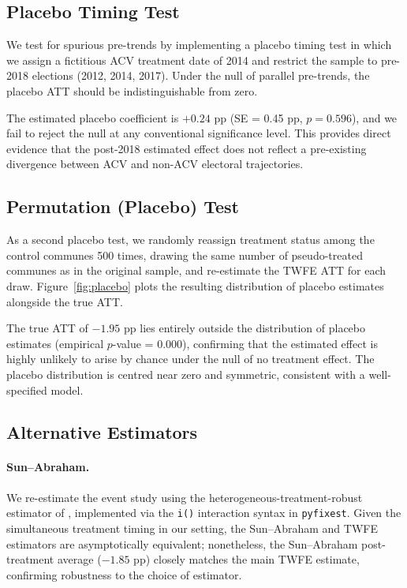 \subsection{Placebo Timing Test}

We test for spurious pre-trends by implementing a placebo timing test in which we assign a fictitious ACV treatment date of 2014 and restrict the sample to pre-2018 elections (2012, 2014, 2017). Under the null of parallel pre-trends, the placebo ATT should be indistinguishable from zero.

The estimated placebo coefficient is $+0.24$ pp (SE = 0.45 pp, $p = 0.596$), and we fail to reject the null at any conventional significance level. This provides direct evidence that the post-2018 estimated effect does not reflect a pre-existing divergence between ACV and non-ACV electoral trajectories.

\subsection{Permutation (Placebo) Test}

As a second placebo test, we randomly reassign treatment status among the control communes 500 times, drawing the same number of pseudo-treated communes as in the original sample, and re-estimate the TWFE ATT for each draw. Figure~\ref{fig:placebo} plots the resulting distribution of placebo estimates alongside the true ATT.

The true ATT of $-1.95$ pp lies entirely outside the distribution of placebo estimates (empirical $p$-value = 0.000), confirming that the estimated effect is highly unlikely to arise by chance under the null of no treatment effect. The placebo distribution is centred near zero and symmetric, consistent with a well-specified model.

\subsection{Alternative Estimators}

\paragraph{Sun--Abraham.} We re-estimate the event study using the heterogeneous-treatment-robust estimator of \citet{Sun2021}, implemented via the \texttt{i()} interaction syntax in \texttt{pyfixest}. Given the simultaneous treatment timing in our setting, the Sun--Abraham and TWFE estimators are asymptotically equivalent; nonetheless, the Sun--Abraham post-treatment average ($-1.85$ pp) closely matches the main TWFE estimate, confirming robustness to the choice of estimator.


